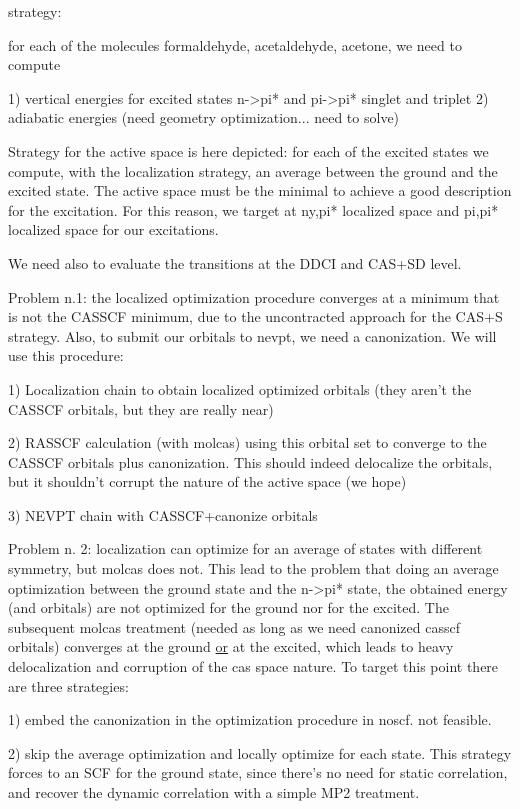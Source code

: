 \documentclass[a4paper]{article}
\begin{document}
strategy:

for each of the molecules formaldehyde, acetaldehyde, acetone, we need to compute

1) vertical energies for excited states n->pi* and pi->pi* singlet and triplet
2) adiabatic energies (need geometry optimization... need to solve)

Strategy for the active space is here depicted: for each of the excited states
we compute, with the localization strategy, an average between the ground and
the excited state. The active space must be the minimal to achieve a good description
for the excitation. For this reason, we target at ny,pi* localized space and pi,pi*
localized space for our excitations.

We need also to evaluate the transitions at the DDCI and CAS+SD level.

Problem n.1: the localized optimization procedure converges at a minimum that is not
the CASSCF minimum, due to the uncontracted approach for the CAS+S strategy. Also,
to submit our orbitals to nevpt, we need a canonization. We will use this procedure:

1) Localization chain to obtain localized optimized orbitals (they aren't the CASSCF
   orbitals, but they are really near)

2) RASSCF calculation (with molcas) using this orbital set to converge to the
   CASSCF orbitals plus canonization. This should indeed delocalize the orbitals,
   but it shouldn't corrupt the nature of the active space (we hope)

3) NEVPT chain with CASSCF+canonize orbitals

Problem n. 2: localization can optimize for an average of states with
different symmetry, but molcas does not. This lead to the problem that doing
an average optimization between the ground state and the n->pi* state, the
obtained energy (and orbitals) are not optimized for the ground nor for the
excited. The subsequent molcas treatment (needed as long as we need canonized
casscf orbitals) converges at the ground \underline{or} at the excited, which leads to
heavy delocalization and corruption of the cas space nature. To target this
point there are three strategies:

1) embed the canonization in the optimization procedure in noscf. not
feasible.

2) skip the average optimization and locally optimize for each state.
This strategy forces to an SCF for the ground state, since there's no
need for static correlation, and recover the dynamic correlation with a simple
MP2 treatment. 
\end{document}
